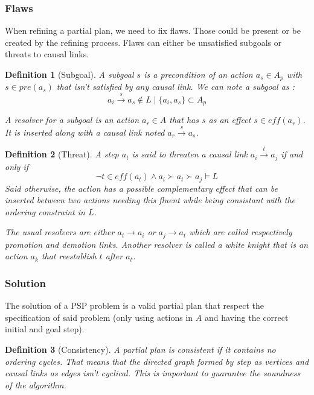 \documentclass[]{article}
\newtheorem{definition}{Definition}
\begin{document}
\subsubsection{Flaws}\label{flaws}

When refining a partial plan, we need to fix flaws. Those could be
present or be created by the refining process. Flaws can either be
unsatisfied subgoals or threats to causal links.

\begin{definition}[Subgoal]

A subgoal \(s\) is a precondition of an action \(a_s \in A_p\) with
\(s \in pre(a_s)\) that isn't satisfied by any causal link. We can note
a subgoal as :
\[a_i \xrightarrow{s} a_s \notin L \mid \{ a_i, a_s \} \subset A_p \]

A resolver for a subgoal is an action \(a_r \in A\) that has \(s\) as an
effect \(s \in eff(a_r)\). It is inserted along with a causal link noted
\(a_r \xrightarrow{s} a_s\).

\end{definition}

\begin{definition}[Threat]

A step \(a_t\) is said to threaten a causal link
\(a_i \xrightarrow{t} a_j\) if and only if
\[\neg t \in eff(a_t) \land a_i \succ a_t \succ a_j \models L\] Said
otherwise, the action has a possible complementary effect that can be
inserted between two actions needing this fluent while being consistant
with the ordering constraint in \(L\).

The usual resolvers are either \(a_t \to a_i\) or \(a_j \to a_t\) which
are called respectively promotion and demotion links. Another resolver
is called a white knight that is an action \(a_k\) that reestablish
\(t\) after \(a_t\).

\end{definition}

\subsubsection{Solution}\label{solution}

The solution of a PSP problem is a valid partial plan that respect the
specification of said problem (only using actions in \(A\) and having
the correct initial and goal step).

\begin{definition}[Consistency]

A partial plan is consistent if it contains no ordering cycles. That
means that the directed graph formed by step as vertices and causal
links as edges isn't cyclical. This is important to guarantee the
soundness of the algorithm.

\end{definition}
\end{document}
